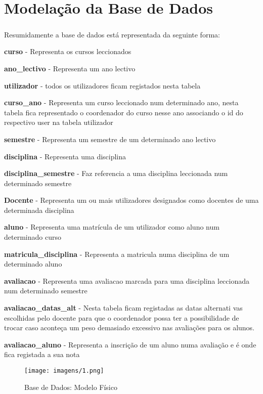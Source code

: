 \chapter{Modelação da Base de Dados}

\paragraph{}

Resumidamente a base de dados está representada da seguinte forma:

\begin{list}{\textbf{-}}{\textbf{TABELAS}}
\item \textbf{curso} - Representa os cursos leccionados
\item \textbf{ano\_lectivo} - Representa um ano lectivo
\item \textbf{utilizador} - todos os utilizadores ficam registados nesta tabela
\item \textbf{curso\_ano} - Representa um curso leccionado num determinado ano, nesta tabela fica representado o coordenador do curso nesse ano associando o id do respectivo user na tabela utilizador
\item \textbf{semestre} - Representa um semestre de um determinado ano lectivo
\item \textbf{disciplina} - Representa uma disciplina
\item \textbf{disciplina\_semestre} - Faz referencia a uma disciplina leccionada num determinado semestre
\item \textbf{Docente} - Representa um ou mais utilizadores designados como docentes de uma determinada disciplina
\item \textbf{aluno} - Representa uma matrícula de um utilizador como aluno num determinado curso
\item \textbf{matricula\_disciplina} - Representa a matricula numa disciplina de um determinado aluno
\item \textbf{avaliacao} - Representa uma avaliacao marcada para uma disciplina leccionada num determinado semestre
\item \textbf{avaliacao\_datas\_alt} - Nesta tabela ficam registadas as datas alternati vas escolhidas pelo docente para que o coordenador possa ter a possibilidade de trocar caso aconteça um peso demasiado excessivo nas avaliações para os alunos.
\item \textbf{avaliacao\_aluno} - Representa a inscrição de um aluno numa avaliação e é onde fica registada a sua nota
\end{list}

\begin{figure}[!htbp]
\centering
\texttt{[image: imagens/1.png]}
\caption{Base de Dados: Modelo Físico}
\label{fig:modelo_fisico}
\end{figure}

